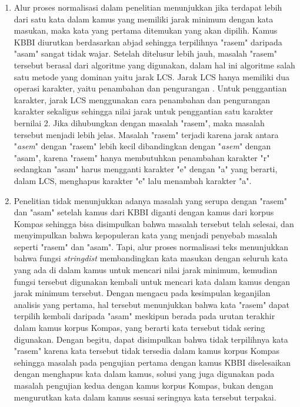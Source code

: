 \begin{enumerate}
	\item Alur proses normalisasi dalam penelitian menunjukkan jika terdapat lebih dari satu kata dalam kamus yang memiliki jarak minimum dengan kata masukan, maka kata yang pertama ditemukan yang akan dipilih. Kamus KBBI diurutkan berdasarkan abjad sehingga terpilihnya "rasem" daripada "asam" sangat tidak wajar. Setelah ditelusur lebih jauh, masalah "rasem" tersebut berasal dari algoritme yang digunakan, dalam hal ini algoritme salah satu metode yang dominan yaitu jarak LCS. Jarak LCS hanya memiliki dua operasi karakter, yaitu penambahan dan pengurangan \parencite{van2014stringdist}. Untuk penggantian karakter, jarak LCS menggunakan cara penambahan dan pengurangan karakter sekaligus sehingga nilai jarak untuk penggantian satu karakter bernilai 2. Jika dihubungkan dengan masalah "rasem", maka masalah tersebut menjadi lebih jelas. Masalah "rasem" terjadi karena jarak antara "\textit{asem}" dengan "rasem" lebih kecil dibandingkan dengan "\textit{asem}" dengan "asam", karena "rasem" hanya membutuhkan penambahan karakter "r" sedangkan "asam" harus mengganti karakter "e" dengan "a" yang berarti, dalam LCS, menghapus karakter "e" lalu menambah karakter "a".
	\item Penelitian tidak menunjukkan adanya masalah yang serupa dengan "rasem" dan "asam" setelah kamus dari KBBI diganti dengan kamus dari korpus Kompas sehingga bisa disimpulkan bahwa masalah tersebut telah selesai, dan menyimpulkan bahwa kepopuleran kata yang menjadi penyebab masalah seperti "rasem" dan "asam". Tapi, alur proses normalisasi teks menunjukkan bahwa fungsi \textit{stringdist} membandingkan kata masukan dengan seluruh kata yang ada di dalam kamus untuk mencari nilai jarak minimum, kemudian fungsi tersebut digunakan kembali untuk mencari kata dalam kamus dengan jarak minimum tersebut. Dengan mengacu pada kesimpulan keganjilan analisis yang pertama, hal tersebut menunjukkan bahwa kata "rasem" dapat terpilih kembali daripada "asam" meskipun berada pada urutan terakhir dalam kamus korpus Kompas, yang berarti kata tersebut tidak sering digunakan. Dengan begitu, dapat disimpulkan bahwa tidak terpilihnya kata "rasem" karena kata tersebut tidak tersedia dalam kamus korpus Kompas sehingga masalah pada pengujian pertama dengan kamus KBBI diselesaikan dengan menghapus kata dalam kamus, solusi yang juga digunakan pada masalah pengujian kedua dengan kamus korpus Kompas, bukan dengan mengurutkan kata dalam kamus sesuai seringnya kata tersebut terpakai.
\end{enumerate}


